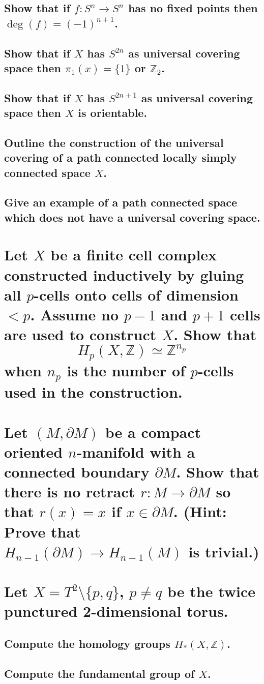 \documentclass[10pt]{article}
\newcommand{\del}{\ensuremath{\partial}}
\newcommand{\advsection}{\addtocounter{section}{1} \setcounter{subsection}{0}}
\newcommand{\hint}[1]{(Hint: #1)}
\begin{document}
\advsection{}

\subsection{Show that if $f: S^n \to S^n$ has no fixed points then $\deg(f) = (-1)^{n+1}$.}

\subsection{Show that if $X$ has $S^{2n}$ as universal covering space then $\pi_1(x) = \{1\}$ or $\mathbb{Z}_2$.}

\subsection{Show that if $X$ has $S^{2n+1}$ as universal covering space then $X$ is orientable.}

\advsection{}

\subsection{Outline the construction of the universal covering of a path connected locally simply
  connected space $X$.}

\subsection{Give an example of a path connected space which does not have a universal covering space.}

\section{Let $X$ be a finite cell complex constructed inductively by gluing all $p$-cells onto cells
of dimension $<p$. Assume no $p-1$ and $p+1$ cells are used to construct $X$. Show that 
$$H_p(X,\mathbb{Z}) \simeq \mathbb{Z}^{n_p}$$
when $n_p$ is the number of $p$-cells used in the construction.}

\section{Let $(M, \del M)$ be a compact oriented $n$-manifold with a connected boundary $\del
  M$. Show that there is no retract $r:M \to \del M$ so that $r(x) =x$ if $x \in \del M$. 
\hint{Prove that $H_{n-1}(\del M) \to H_{n-1}(M)$ is trivial.}}

\section{Let $X = T^2 \setminus \{ p,q\}$, $p \neq q$ be the twice punctured 2-dimensional torus.}

\subsection{Compute the homology groups $H_*(X,\mathbb{Z})$.}

\subsection{Compute the fundamental group of $X$.}
\end{document}
